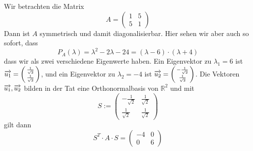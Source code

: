 \begin{beispiel} Wir betrachten die Matrix
  	$$ A = \left( \begin{matrix} 1 & 5 \\5 & 1 \end{matrix} \right) $$
Dann ist $A$ symmetrisch und damit diagonalisierbar. Hier sehen wir aber auch so sofort, dass
  	$$ P_A(\lambda) = \lambda^2 - 2 \lambda - 24 = \left(\lambda - 6 \right) \cdot \left( \lambda + 4 \right) $$
dass wir als zwei verschiedene Eigenwerte haben. Ein Eigenvektor zu $\lambda_1 = 6$ ist 
$\overrightarrow{u_1} = \left( \begin{smallmatrix} \frac {1}{\sqrt{2}} \\ \frac {1}{\sqrt{2}} \end{smallmatrix} \right)$, 
und ein Eigenvektor zu $\lambda_2 = -4$ ist $\overrightarrow{u_2} = 
 \left( \begin{smallmatrix} -\frac {1}{\sqrt{2}} \\ \frac {1}{\sqrt{2}} \end{smallmatrix} \right)$. Die Vektoren 
$\overrightarrow{u_1}, \overrightarrow{u_2}$ bilden in der Tat eine Orthonormalbasis von $\mathbb R^2$ und mit 
  	$$ S := \left( \begin{matrix} -\frac {1}{\sqrt{2}} & \frac {1}{\sqrt{2}} \\ 
	\frac {1}{\sqrt{2}} & \frac {1}{\sqrt{2}} \end{matrix} \right) $$ 
gilt dann
  	$$ S^T \cdot A \cdot S = \left( \begin{matrix} -4 & 0 \\ 0 & 6 \end{matrix} \right) $$
\end{beispiel}

